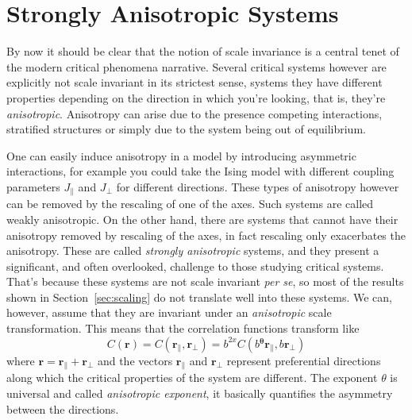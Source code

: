 \section{Strongly Anisotropic Systems}
\label{ch:anis}

By now it should be clear that the notion of scale invariance is a central
tenet of the modern critical phenomena narrative. Several critical systems
however are explicitly not scale invariant in its strictest sense, systems they
have different properties depending on the direction in which you're looking,
that is, they're \textit{anisotropic}. Anisotropy can arise due to the presence
competing interactions, stratified structures or simply due to the system being
out of equilibrium.

One can easily induce anisotropy in a model by introducing asymmetric
interactions, for example you could take the Ising model with different
coupling parameters $J_\parallel$ and $J_\perp$ for different directions. These
types of anisotropy however can be removed by the rescaling of one of the axes.
Such systems are called weakly anisotropic. On the other hand, there are
systems that cannot have their anisotropy removed by rescaling of the axes, in
fact rescaling only exacerbates the anisotropy. These are called
\textit{strongly anisotropic} systems, and they present a significant, and
often overlooked, challenge to those studying critical systems. That's because
these systems are not scale invariant \textit{per se}, so most of the results
shown in Section~\ref{sec:scaling} do not translate well into these systems.
We can, however, assume that they are invariant under an \textit{anisotropic}
scale transformation. This means that the correlation functions transform like
\begin{equation}
    C\left(\mathbf{r}\right)=
    C\left(\mathbf{r}_{\parallel},\mathbf{r}_{\perp}\right)=
    b^{2x}C\left(b\mathbf{^{\theta}r}_{\parallel},b\mathbf{r}_{\perp}\right)
\end{equation}
where $\mathbf{r}=\mathbf{r}_{\parallel}+\mathbf{r}_{\perp}$ and the vectors
$\mathbf{r}_{\parallel}$ and $\mathbf{r}_{\perp}$ represent preferential
directions along which the critical properties of the system are different. The
exponent $\theta$ is universal and called \textit{anisotropic exponent}, it
basically quantifies the asymmetry between the directions.

